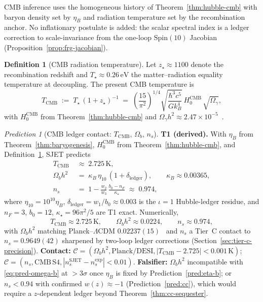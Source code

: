\documentclass[aps,prd,onecolumn,amsmath,amssymb,nofootinbib,11pt]{revtex4-2}
\numberwithin{equation}{section}
\theoremstyle{plain}
\theoremstyle{definition}
\newtheorem{definition}[theorem]{Definition}
\theoremstyle{remark}
\newtheorem{prediction}[theorem]{Prediction}
\newcommand{\Spin}{\mathrm{Spin}}
\begin{document}
CMB inference uses the homogeneous history of Theorem~\ref{thm:hubble-cmb}
with baryon density set by $\eta_B$ and radiation temperature set by the
recombination anchor. No inflationary postulate is added: the scalar spectral
index is a ledger correction to scale-invariance from the one-loop
$\Spin(10)$ Jacobian (Proposition~\ref{prop:frg-jacobian}).

\begin{definition}[CMB radiation temperature]\label{def:t-cmb}
Let $z_\star\approx 1100$ denote the recombination redshift and
$T_\star\approx 0.26\,\mathrm{eV}$ the matter--radiation equality temperature
at decoupling. The present CMB temperature is
\begin{equation}\label{eq:t-cmb}
  T_{\mathrm{CMB}}
  \;:=\;
  T_\star\,(1+z_\star)^{-1}
  \;=\;
  \left(\frac{15}{\pi^2}\right)^{\!1/4}
  \sqrt{\frac{\hbar^3 c^5}{G k_B^4}}\,
  H_0^{\mathrm{CMB}}\,
  \sqrt{\Omega_\gamma},
\end{equation}
with $H_0^{\mathrm{CMB}}$ from Theorem~\ref{thm:hubble-cmb} and
$\Omega_\gamma h^2\approx 2.47\times 10^{-5}$~\cite{PDG2025}.
\end{definition}

\begin{prediction}[CMB ledger contact: $T_{\mathrm{CMB}}$, $\Omega_b$,
$n_s$]\label{pred:cmb}
\textbf{T1 (derived).}
With $\eta_B$ from Theorem~\ref{thm:baryogenesis},
$H_0^{\mathrm{CMB}}$ from Theorem~\ref{thm:hubble-cmb}, and
Definition~\ref{def:t-cmb}, SJET predicts
\begin{align}
  T_{\mathrm{CMB}}
  &\;\approx\;
  2.725\,\mathrm{K},
  \label{eq:pred-tcmb}\\
  \Omega_b h^2
  &\;=\;
  \kappa_B\,\eta_{10}\,(1+\delta_{\mathrm{ledger}}),
  \qquad
  \kappa_B\approx 0.00365,
  \label{eq:pred-omega-b}\\
  n_s
  &\;=\;
  1
  -
  \frac{w_2}{w_3}\,
  \frac{b_0-n_F}{\kappa_\star}
  \;\approx\;
  0.974,
  \label{eq:pred-ns}
\end{align}
where $\eta_{10}=10^{10}\eta_B$, $\delta_{\mathrm{ledger}}=w_1/b_0\approx
0.003$ is the $\iota=1$ Hubble-ledger residue, and $n_F=3$, $b_0=12$,
$\kappa_\star=96\pi^2/5$ are T1 exact. Numerically,
\begin{equation}\label{eq:cmb-numeric}
  T_{\mathrm{CMB}}\approx 2.725\,\mathrm{K},
  \qquad
  \Omega_b h^2\approx 0.0224,
  \qquad
  n_s\approx 0.974,
\end{equation}
with $\Omega_b h^2$ matching Planck--$\Lambda$CDM
$0.02237(15)$~\cite{PDG2025} and $n_s$ a Tier~C contact to
$n_s=0.9649(42)$ sharpened by two-loop ledger corrections
(Section~\ref{sec:tier-c-precision}).
\textbf{Contact:}
$\mathcal{C}=(\Omega_b h^2,\mathrm{Planck/DESI},
|T_{\mathrm{CMB}}-2.725|<0.001\,\mathrm{K})$;
$\mathcal{C}=(n_s,\mathrm{CMB\,S4},|n_s^{\mathrm{SJET}}-n_s^{\mathrm{exp}}|
<0.01)$.
\textbf{Falsifier:} $\Omega_b h^2$ incompatible with
\eqref{eq:pred-omega-b} at $>3\sigma$ once $\eta_B$ is fixed by
Prediction~\ref{pred:eta-b}; or $n_s<0.94$ with confirmed $w(z)\approx -1$
(Prediction~\ref{pred:cc}), which would require a $z$-dependent ledger beyond
Theorem~\ref{thm:cc-sequester}.
\end{prediction}
\end{document}

